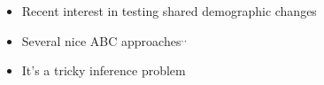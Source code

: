 \begin{frame}
    \begin{columns}

        \begin{itemize}
            \item Recent interest in testing shared demographic changes

            \item Several nice ABC approaches\footnotemark$^,$\footnotemark$^,$\footnotemark

            \item It's a tricky inference problem
        \end{itemize}
    \end{columns}
\end{frame}
